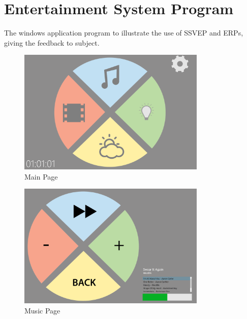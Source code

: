 \section{Entertainment System Program}
\hspace{1.5cm}The windows application program to illustrate the use of SSVEP and ERPs, giving the feedback to subject.



\begin{figure}[ht]
	\centering
	\includegraphics[width=0.8\textwidth]{chapter6/pagemain.png}
	\caption{Main Page}
\end{figure}

\begin{figure}[ht]
	\centering
	\includegraphics[width=0.8\textwidth]{chapter6/pagemusic.png}
	\caption{Music Page}
\end{figure}

